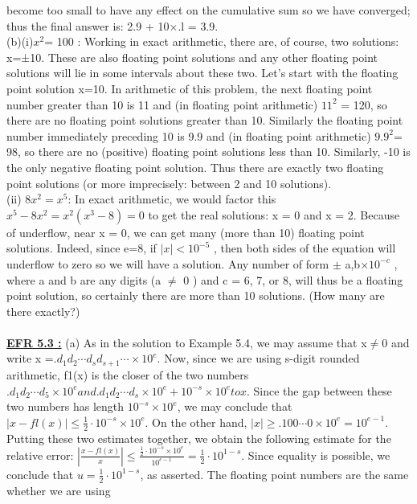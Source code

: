 \documentclass[../main.tex]{subfiles}
\begin{document}
become too small to have any effect on the cumulative sum so we have converged; thus the final 
answer is: 2.9 + 10$\times$.l = 3.9.\\
(b)(i)$x^2$= 100 : Working in exact arithmetic, there are, of course, two solutions: x=±10. These are 
also floating point solutions and any other floating point solutions will lie in some intervals about these 
two. Let's start with the floating point solution x=10. In arithmetic of this problem, the next floating point number greater than 10 is 11 and (in floating point arithmetic) $11^2$ = 120, so there are no floating 
point solutions greater than 10. Similarly the floating point number immediately preceding 10 is 9.9 
and (in floating point arithmetic) $9.9^2$= 98, so there are no (positive) floating point solutions less than 
10. Similarly, -10 is the only negative floating point solution. Thus there are exactly two floating 
point solutions (or more imprecisely: between 2 and 10 solutions). \\
(ii) $8x^2=x^5$: In exact arithmetic, we would factor this $x^5-8x^2=x^2(x^3-8)=0$ to get the real 
solutions: x = 0 and x = 2. Because of underflow, near x = 0, we can get many (more than 10) floating 
point solutions. Indeed, since e=8, if $|x|<10^{-5}$
, then both sides of the equation will underflow to 
zero so we will have a solution. Any number of form $\pm$ a,b$ \times 10^{-c}$
, where a and b are any digits 
(a $\neq$ 0 ) and c = 6, 7, or 8, will thus be a floating point solution, so certainly there are more than 10 
solutions. (How many are there exactly?)
\\
\\
\textbf{\underline{EFR 5.3 :}} (a) As in the solution to Example 5.4, we may assume that x$\neq$0 and write 
x =$.d_1d_2 \cdots d_sd_{s+1} \cdots \times 10^e.$ Now, since we are using s-digit rounded arithmetic, f1(x) is the closer of 
the two numbers$ .d_1d_2 \cdots d_5 \times 10^e and .d_1d_2 \cdots d_s \times 10^e + 10^{-s} \times 10^e to x$. Since the gap between these two numbers has length $10^{-s} \times 10^{e}$, we may conclude that $|x-fl(x)| \leq \frac{1}{2} \cdot 10^{-s} \times 10^{e}$. On the other hand, $|x| \geq .100 \cdots 0 \times 10^{e}=10^{e-1}$. Putting these two estimates together, we obtain the following estimate for the relative error: $\left|\frac{x-fl(x)}{x}\right| \leq \frac{\frac{1}{2} \cdot 10^{-s} \times 10^{e}}{10^{e-1}}=\frac{1}{2} \cdot 10^{1-s}$. Since equality is possible, we conclude that  $u=\frac{1}{2} \cdot 10^{1-s}$, as asserted. The floating point numbers are the same whether we are using 
\end{document}
